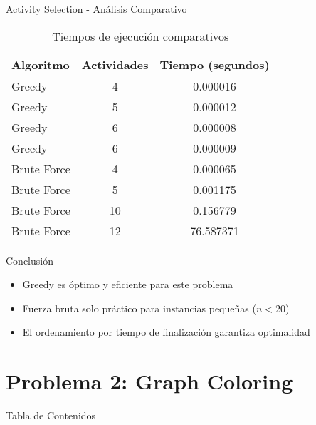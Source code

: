 \documentclass[aspectratio=169]{beamer}
\begin{document}
\begin{frame}{Activity Selection - Análisis Comparativo}

\begin{table}
\centering
\small
\begin{tabular}{lcc}
\toprule
\textbf{Algoritmo} & \textbf{Actividades} & \textbf{Tiempo (segundos)} \\
\midrule
Greedy & 4 & 0.000016 \\
Greedy & 5 & 0.000012 \\
Greedy & 6 & 0.000008 \\
Greedy & 6 & 0.000009 \\
Brute Force & 4 & 0.000065 \\
Brute Force & 5 & 0.001175 \\
Brute Force & 10 & 0.156779 \\
Brute Force & 12 & 76.587371 \\
\bottomrule
\end{tabular}
\caption{Tiempos de ejecución comparativos}
\end{table}

\begin{block}{Conclusión}
\begin{itemize}
\item Greedy es óptimo y eficiente para este problema
\item Fuerza bruta solo práctico para instancias pequeñas ($n < 20$)
\item El ordenamiento por tiempo de finalización garantiza optimalidad
\end{itemize}
\end{block}
\end{frame}

\section{Problema 2: Graph Coloring}

\begin{frame}{Tabla de Contenidos}
\end{frame}
\end{document}

